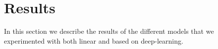 \section{Results}

In this section we describe the results of the different models that we experimented with both linear and based on deep-learning. 